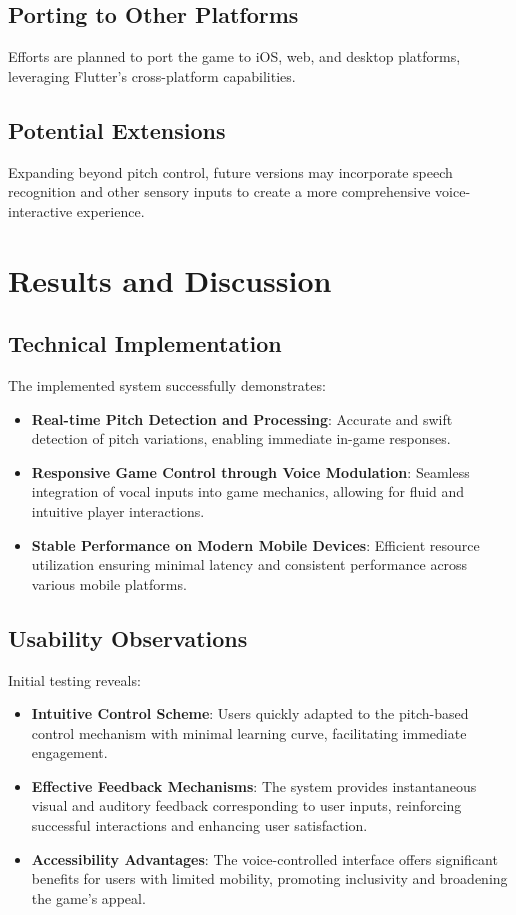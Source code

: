 \documentclass[runningheads]{llncs}
\begin{document}
\subsection{Porting to Other Platforms}
Efforts are planned to port the game to iOS, web, and desktop platforms, leveraging Flutter's cross-platform capabilities.

\subsection{Potential Extensions}
Expanding beyond pitch control, future versions may incorporate speech recognition and other sensory inputs to create a more comprehensive voice-interactive experience.

\section{Results and Discussion}
\subsection{Technical Implementation}
The implemented system successfully demonstrates:
\begin{itemize}
    \item \textbf{Real-time Pitch Detection and Processing}: Accurate and swift detection of pitch variations, enabling immediate in-game responses.
    \item \textbf{Responsive Game Control through Voice Modulation}: Seamless integration of vocal inputs into game mechanics, allowing for fluid and intuitive player interactions.
    \item \textbf{Stable Performance on Modern Mobile Devices}: Efficient resource utilization ensuring minimal latency and consistent performance across various mobile platforms.
\end{itemize}

\subsection{Usability Observations}
Initial testing reveals:
\begin{itemize}
    \item \textbf{Intuitive Control Scheme}: Users quickly adapted to the pitch-based control mechanism with minimal learning curve, facilitating immediate engagement.
    \item \textbf{Effective Feedback Mechanisms}: The system provides instantaneous visual and auditory feedback corresponding to user inputs, reinforcing successful interactions and enhancing user satisfaction.
    \item \textbf{Accessibility Advantages}: The voice-controlled interface offers significant benefits for users with limited mobility, promoting inclusivity and broadening the game's appeal.
\end{itemize}
\end{document}
